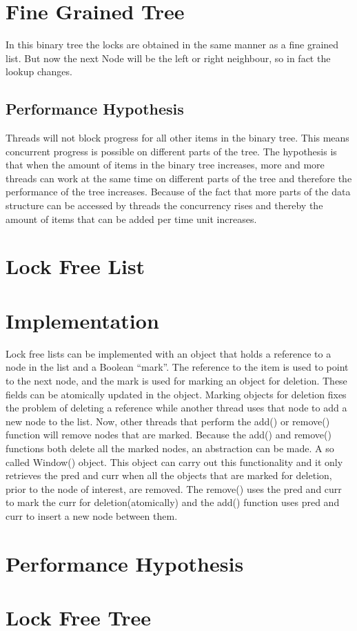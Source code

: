 \documentclass[10pt,a4paper]{article}
\begin{document}
\section{Fine Grained Tree} In this binary tree the locks are obtained in the
same manner as a fine grained list. But now the next Node will be the left or
right neighbour, so in fact the lookup changes. 

\subsection{Performance Hypothesis} Threads will not block progress for all
other items in the binary tree. This means concurrent progress is possible on
different parts of the tree.  The hypothesis is that when the amount of items
in the binary tree increases, more and more threads can work at the same time
on different parts of the tree and therefore the performance of the tree
increases.  Because of the fact that more parts of the data structure can be
accessed by threads the concurrency rises and thereby the amount of items that
can be added per time unit increases.


\section{Lock Free List} \section{Implementation} Lock free lists can be
implemented with an object that holds a reference to a node in the list and a
Boolean ``mark''. The reference to the item is used to point to the next node,
and the mark is used for marking an object for deletion. These fields can be
atomically updated in the object. Marking objects for deletion fixes the
problem of deleting a reference while another thread uses that node to add a
new node to the list. Now, other threads that perform the add() or remove()
function will remove nodes that are marked. Because the add() and remove()
functions both delete all the marked nodes, an abstraction can be made. A so
called Window() object. This object can carry out this functionality and it
only retrieves the pred and curr when all the objects that are marked for deletion,
prior to the node of interest, are removed. The remove() uses the
pred and curr to mark the curr for deletion(atomically) and the add() function
uses pred and curr to insert a new node between them.

\section{Performance Hypothesis}

\section{Lock Free Tree}
\end{document}
